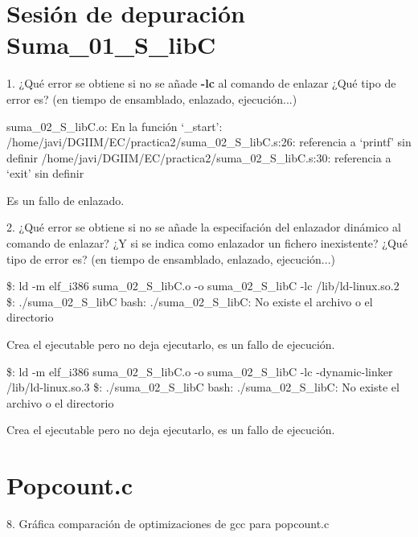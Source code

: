 \documentclass{article}
\begin{document}
\section{Sesión de depuración Suma\_01\_S\_libC}
  \begin{flushleft}
    {\large 1. ¿Qué error se obtiene si no se añade \textbf{-lc} al comando de enlazar
    ¿Qué tipo de error es? (en tiempo de ensamblado, enlazado, ejecución...)} \break

    suma\_02\_S\_libC.o: En la función `\_start': \break
   /home/javi/DGIIM/EC/practica2/suma\_02\_S\_libC.s:26: referencia a `printf' sin definir \break
   /home/javi/DGIIM/EC/practica2/suma\_02\_S\_libC.s:30: referencia a `exit' sin definir \break

   Es un fallo de enlazado.

   \vspace{\baselineskip}
   {\large 2. ¿Qué error se obtiene si no se añade la especifación del enlazador dinámico al comando de enlazar?
   ¿Y si se indica como enlazador un fichero inexistente?
   ¿Qué tipo de error es? (en tiempo de ensamblado, enlazado, ejecución...)} \break

   \$: ld -m elf\_i386 suma\_02\_S\_libC.o -o suma\_02\_S\_libC -lc /lib/ld-linux.so.2 \break
   \$: ./suma\_02\_S\_libC \break
   bash: ./suma\_02\_S\_libC: No existe el archivo o el directorio \break

   Crea el ejecutable pero no deja ejecutarlo, es un fallo de ejecución. \break

   \$: ld -m elf\_i386 suma\_02\_S\_libC.o -o suma\_02\_S\_libC -lc -dynamic-linker /lib/ld-linux.so.3 \break
   \$: ./suma\_02\_S\_libC \break
   bash: ./suma\_02\_S\_libC: No existe el archivo o el directorio \break

   Crea el ejecutable pero no deja ejecutarlo, es un fallo de ejecución.
  \end{flushleft}

  \section{Popcount.c}
    \begin{flushleft}
      {\large 8. Gráfica comparación de optimizaciones de gcc para popcount.c}
    \end{flushleft}
\end{document}

